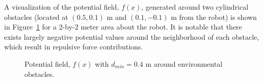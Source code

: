 			A visualization of the potential field, $f(x)$, generated around two cylindrical obstacles (located at $(0.5,0.1)\text{ m}$ and $(0.1,-0.1)\text{ m}$ from the robot) is shown in Figure~\ref{fig::potential_field} for a $2$-by-$2$ meter area about the robot. It is notable that there exists largely negative potential values around the neighborhood of each obstacle, which result in repulsive force contributions.
				\begin{figure}[t!]
					\centering
					\caption{Potential field, $f(x)$ with $d_{min}=0.4\text{ m}$ around environmental obstacles.}
					\label{fig::potential_field}
				\end{figure}

